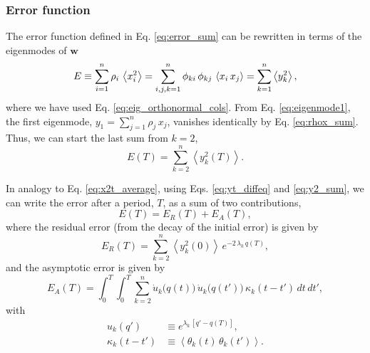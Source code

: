\documentclass[reprint, superscriptaddress, floatfix]{revtex4-1}
\newcommand{\Err}{E}
\begin{document}
\subsubsection{Error function}



The error function defined in Eq. \eqref{eq:error_sum}
can be rewritten in terms of the eigenmodes of $\mathbf w$
%
\begin{align}
  \Err
  \equiv
  \sum_{i = 1}^n \rho_i \,
    \left\langle x_i^2 \right\rangle
  =
  \sum_{i, j, k=1}^n \phi_{ki} \, \phi_{kj} \,
    \left\langle x_i \, x_j \right\rangle
  =
  \sum_{k = 1}^n
    \left\langle
      y_k^2
    \right\rangle
  ,
\notag
\end{align}
%
where we have used Eq. \eqref{eq:eig_orthonormal_cols}.
%
From Eq. \eqref{eq:eigenmode1},
the first eigenmode,
$y_1 = \sum_{j=1}^n \rho_j \, x_j$,
vanishes identically by Eq. \eqref{eq:rhox_sum}.
%
Thus, we can start the last sum %
from $k = 2$,
\begin{equation}
  \Err(T)
  =
  \sum_{k = 2}^n
    \left\langle
    y_k^2(T)
    \right\rangle
  .
\label{eq:y2_sum}
\end{equation}

In analogy to Eq. \eqref{eq:x2t_average},
using Eqs. \eqref{eq:yt_diffeq} and \eqref{eq:y2_sum},
we can write the error after a period, $T$,
as a sum of two contributions,
%
\begin{equation}
  \Err(T)
  =
  \Err_R(T) + \Err_A(T),
  \label{eq:error_split}
\end{equation}
%
where the residual error
(from the decay of the initial error)
is given by
%
\begin{equation}
  \Err_R(T)
  =
  \sum_{k = 2}^n
    \left\langle y_k^2(0) \right\rangle \,
    e^{ - 2 \, \lambda_k  \, q(T) },
  \label{eq:error_res}
\end{equation}
%
and the asymptotic error
is given by
%
\begin{equation}
  \Err_A(T)
  =
  \int_0^T \int_0^T
  \sum_{k = 2}^n
    \dot u_k\bigl( q(t) \bigr) \,
    \dot u_k\bigl( q(t') \bigr) \,
    \kappa_k(t - t') \, dt \, dt',
  \label{eq:error_asym}
\end{equation}
%
with
%
\begin{align*}
  u_k(q')
  &\equiv
  e^{\lambda_k \, [q' - q(T)]},
  \\
  \kappa_k(t - t')
  &\equiv
  \left\langle
    \theta_k(t) \, \theta_k(t')
  \right\rangle.
\end{align*}
\end{document}
